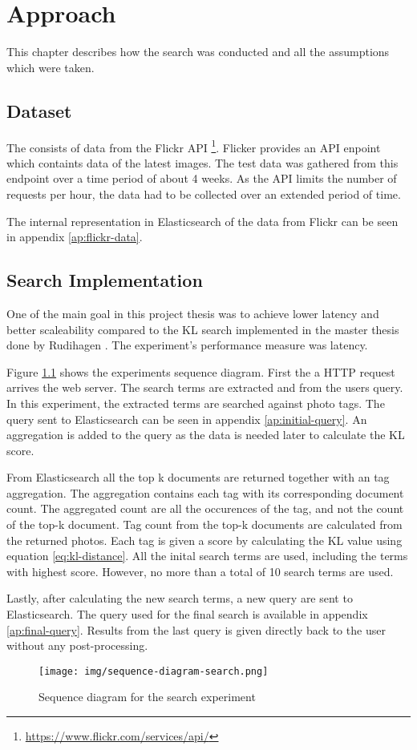\chapter{Approach}
\label{ch:approach}
This chapter describes how the search was conducted and all the assumptions which were taken.

\section{Dataset}
The consists of data from the Flickr API \footnote{\url{https://www.flickr.com/services/api/}}.
Flicker provides an API enpoint which containts data of the latest images.
The test data was gathered from this endpoint over a time period of about 4 weeks.
As the API limits the number of requests per hour, the data had to be collected over an extended period of time.

The internal representation in Elasticsearch of the data from Flickr can be seen in appendix \ref{ap:flickr-data}.

\section{Search Implementation}

One of the main goal in this project thesis was to achieve lower latency and better scaleability compared to the KL search implemented in the master thesis done by Rudihagen \cite{master-thesis}.
The experiment's performance measure was latency.

Figure \ref{fig:sequence-diagram-search} shows the experiments sequence diagram.
First the a HTTP request arrives the web server.
The search terms are extracted and from the users query.
In this experiment, the extracted terms are searched against photo tags.
The query sent to Elasticsearch can be seen in appendix \ref{ap:initial-query}.
An aggregation is added to the query as the data is needed later to calculate the KL score.

From Elasticsearch all the top k documents are returned together with an tag aggregation.
The aggregation contains each tag with its corresponding document count.
The aggregated count are all the occurences of the tag, and not the count of the top-k document.
Tag count from the top-k documents are calculated from the returned photos.
Each tag is given a score by calculating the KL value using equation \ref{eq:kl-distance}.
All the inital search terms are used, including the terms with highest score.
However, no more than a total of 10 search terms are used.

Lastly, after calculating the new search terms, a new query are sent to Elasticsearch.
The query used for the final search is available in appendix \ref{ap:final-query}.
Results from the last query is given directly back to the user without any post-processing.

\begin{figure}[h!]
\centering \texttt{[image: img/sequence-diagram-search.png]}
\caption{Sequence diagram for the search experiment}
\label{fig:sequence-diagram-search}
\end{figure}
